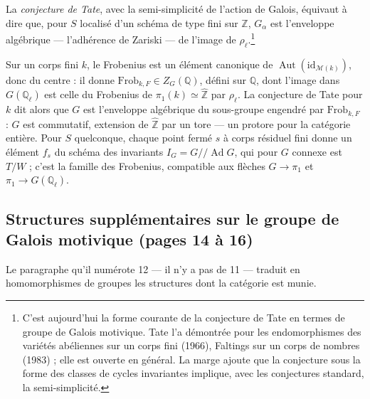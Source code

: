 \documentclass[11pt,a4paper]{article}
\begin{document}
La \emph{conjecture de Tate}, avec la semi-simplicité de l'action de Galois,
équivaut à dire que, pour $S$ localisé d'un schéma de type fini sur
$\mathbb{Z}$, $G_{\alpha}$ est l'enveloppe algébrique --- l'adhérence de
Zariski --- de l'image de $\rho_{\ell}$.\footnote{C'est aujourd'hui la forme
courante de la conjecture de Tate en termes de groupe de Galois motivique.
Tate l'a démontrée pour les endomorphismes des variétés abéliennes sur un corps
fini (1966), Faltings sur un corps de nombres (1983) ; elle est ouverte en
général. La marge ajoute que la conjecture sous la forme des classes de cycles
invariantes implique, avec les conjectures standard, la semi-simplicité.}

Sur un corps fini $k$, le Frobenius est un élément canonique de
$\operatorname{Aut}(\mathrm{id}_{\mathcal{M}(k)})$, donc du centre : il donne
$\mathrm{Frob}_{k,F} \in Z_{G}(\mathbb{Q})$, défini sur $\mathbb{Q}$, dont
l'image dans $G(\mathbb{Q}_{\ell})$ est celle du Frobenius de $\pi_{1}(k) \simeq
\hat{\mathbb{Z}}$ par $\rho_{\ell}$. La conjecture de Tate pour $k$ dit alors
que $G$ est l'enveloppe algébrique du sous-groupe engendré par
$\mathrm{Frob}_{k,F}$ : $G$ est commutatif, extension de $\hat{\mathbb{Z}}$ par
un tore --- un protore pour la catégorie entière. Pour $S$ quelconque, chaque
point fermé $s$ à corps résiduel fini donne un élément $f_{s}$ du schéma des
invariants $I_{G} = G /\!\!/ \operatorname{Ad} G$, qui pour $G$ connexe est $T/W$ ;
c'est la famille des Frobenius, compatible aux flèches $G \to \pi_{1}$ et
$\pi_{1} \to G(\mathbb{Q}_{\ell})$.

\subsection*{Structures supplémentaires sur le groupe de Galois motivique (pages 14 à 16)}

Le paragraphe qu'il numérote 12 --- il n'y a pas de 11 --- traduit en
homomorphismes de groupes les structures dont la catégorie est munie.
\end{document}
